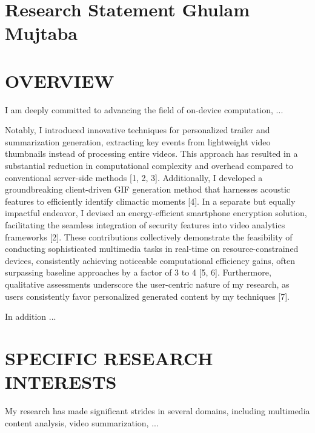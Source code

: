 
\vspace{1.0cm}

\section*{\centering Research Statement \hfill Ghulam Mujtaba \hfill\hspace*{\fill}\monthYear}

\vspace*{5pt}





\section*{OVERVIEW}
\justifying
I am deeply committed to advancing the field of on-device computation, ...

Notably, I introduced innovative techniques for personalized trailer and summarization generation, extracting key events from lightweight video thumbnails instead of processing entire videos. This approach has resulted in a substantial reduction in computational complexity and overhead compared to conventional server-side methods [1, 2, 3]. Additionally, I developed a groundbreaking client-driven GIF generation method that harnesses acoustic features to efficiently identify climactic moments [4]. In a separate but equally impactful endeavor, I devised an energy-efficient smartphone encryption solution, facilitating the seamless integration of security features into video analytics frameworks [2]. These contributions collectively demonstrate the feasibility of conducting sophisticated multimedia tasks in real-time on resource-constrained devices, consistently achieving noticeable computational efficiency gains, often surpassing baseline approaches by a factor of 3 to 4 [5, 6]. Furthermore, qualitative assessments underscore the user-centric nature of my research, as users consistently favor personalized generated content by my techniques [7].


In addition ...


\section*{SPECIFIC RESEARCH INTERESTS}

My research has made significant strides in several domains, including multimedia content analysis, video summarization, ...



